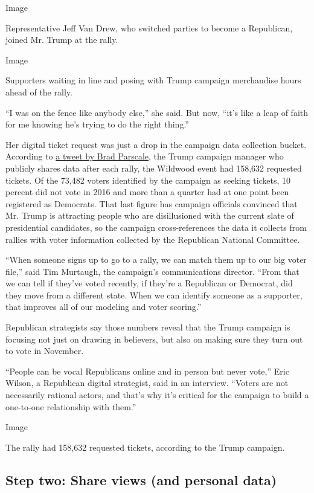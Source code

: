 Image

Representative Jeff Van Drew, who switched parties to become a
Republican, joined Mr. Trump at the rally.

Image

Supporters waiting in line and posing with Trump campaign merchandise
hours ahead of the rally.

``I was on the fence like anybody else,'' she said. But now, ``it's like
a leap of faith for me knowing he's trying to do the right thing.''

Her digital ticket request was just a drop in the campaign data
collection bucket. According to
\href{https://twitter.com/parscale/status/1222317267716837386?lang=en}{a
tweet by Brad Parscale}, the Trump campaign manager who publicly shares
data after each rally, the Wildwood event had 158,632 requested tickets.
Of the 73,482 voters identified by the campaign as seeking tickets, 10
percent did not vote in 2016 and more than a quarter had at one point
been registered as Democrats. That last figure has campaign officials
convinced that Mr. Trump is attracting people who are disillusioned with
the current slate of presidential candidates, so the campaign
cross-references the data it collects from rallies with voter
information collected by the Republican National Committee.

``When someone signs up to go to a rally, we can match them up to our
big voter file,'' said Tim Murtaugh, the campaign's communications
director. ``From that we can tell if they've voted recently, if they're
a Republican or Democrat, did they move from a different state. When we
can identify someone as a supporter, that improves all of our modeling
and voter scoring.''

Republican strategists say those numbers reveal that the Trump campaign
is focusing not just on drawing in believers, but also on making sure
they turn out to vote in November.

``People can be vocal Republicans online and in person but never vote,''
Eric Wilson, a Republican digital strategist, said in an interview.
``Voters are not necessarily rational actors, and that's why it's
critical for the campaign to build a one-to-one relationship with
them.''

Image

The rally had 158,632 requested tickets, according to the Trump
campaign.

\hypertarget{step-two-share-views-and-personal-data}{%
\subsection{Step two: Share views (and personal
data)}\label{step-two-share-views-and-personal-data}}


